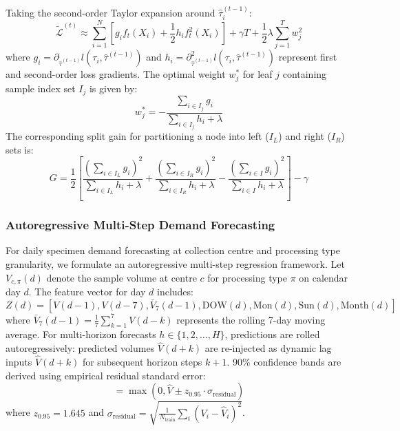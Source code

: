 \documentclass[conference]{IEEEtran}
\begin{document}
Taking the second-order Taylor expansion around $\hat{\tau}_i^{(t-1)}$:
\begin{equation}
\tilde{\mathcal{L}}^{(t)} \approx \sum_{i=1}^N \left[ g_i f_t(X_i) + \frac{1}{2} h_i f_t^2(X_i) \right] + \gamma T + \frac{1}{2} \lambda \sum_{j=1}^T w_j^2
\end{equation}
where $g_i = \partial_{\hat{\tau}^{(t-1)}} l(\tau_i, \hat{\tau}^{(t-1)})$ and $h_i = \partial^2_{\hat{\tau}^{(t-1)}} l(\tau_i, \hat{\tau}^{(t-1)})$ represent first and second-order loss gradients. The optimal weight $w_j^*$ for leaf $j$ containing sample index set $I_j$ is given by:
\begin{equation}
w_j^* = -\frac{\sum_{i \in I_j} g_i}{\sum_{i \in I_j} h_i + \lambda}
\end{equation}
The corresponding split gain for partitioning a node into left ($I_L$) and right ($I_R$) sets is:
\begin{equation}
G = \frac{1}{2} \left[ \frac{(\sum_{i \in I_L} g_i)^2}{\sum_{i \in I_L} h_i + \lambda} + \frac{(\sum_{i \in I_R} g_i)^2}{\sum_{i \in I_R} h_i + \lambda} - \frac{(\sum_{i \in I} g_i)^2}{\sum_{i \in I} h_i + \lambda} \right] - \gamma
\end{equation}

\subsubsection{Autoregressive Multi-Step Demand Forecasting}
For daily specimen demand forecasting at collection centre and processing type granularity, we formulate an autoregressive multi-step regression framework. Let $V_{c, \pi}(d)$ denote the sample volume at centre $c$ for processing type $\pi$ on calendar day $d$. The feature vector for day $d$ includes:
\begin{equation}
Z(d) = [V(d-1), V(d-7), \bar{V}_{7}(d-1), \text{DOW}(d), \text{Mon}(d), \text{Sun}(d), \text{Month}(d)]
\end{equation}
where $\bar{V}_{7}(d-1) = \frac{1}{7} \sum_{k=1}^7 V(d-k)$ represents the rolling 7-day moving average. For multi-horizon forecasts $h \in \{1, 2, \dots, H\}$, predictions are rolled autoregressively: predicted volumes $\hat{V}(d+k)$ are re-injected as dynamic lag inputs $\hat{V}(d+k)$ for subsequent horizon steps $k+1$. 90\% confidence bands are derived using empirical residual standard error:
\begin{equation}
[\hat{V}_{\text{lower}}, \hat{V}_{\text{upper}}] = \max\left(0, \hat{V} \pm z_{0.95} \cdot \sigma_{\text{residual}}\right)
\end{equation}
where $z_{0.95} = 1.645$ and $\sigma_{\text{residual}} = \sqrt{\frac{1}{N_{\text{train}}} \sum_{i} (V_i - \hat{V}_i)^2}$.
\end{document}
